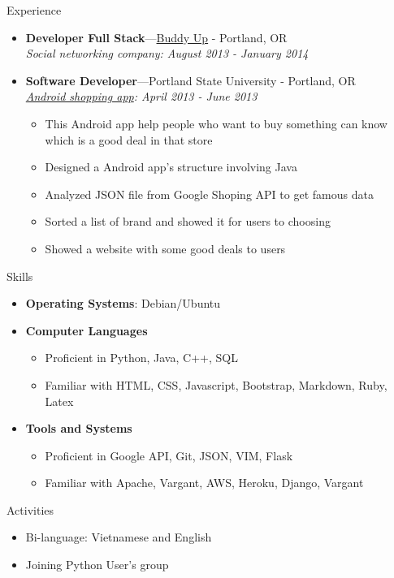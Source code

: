 \documentclass[10pt,oneside]{article}
\newenvironment{ressection}[1]{
    \vspace{4pt}
    {\fontfamily{phv}\selectfont\Large#1}
    \begin{itemize}
    \vspace{3pt}
}{
    \end{itemize}
}
\newcommand{\resitem}[1]{
    \vspace{-4pt}
    \item \begin{flushleft} #1 \end{flushleft}
}
\newcommand{\ressubitem}[1]{
    \vspace{-1pt}
    \item \begin{flushleft} #1 \end{flushleft}
}
\newcommand{\resbigitem}[3]{
    \vspace{-5pt}
    \item
    \textbf{#1}---#2 \\
    \textit{#3}
}
\newenvironment{ressubsec}[3]{
    \resbigitem{#1}{#2}{#3}
    \vspace{-2pt}
    \begin{itemize}
}{
    \end{itemize}
}
\newenvironment{reslist}[1]{
    \resitem{\textbf{#1}}
    \vspace{-5pt}
    \begin{itemize}
}{
    \end{itemize}
}
\begin{document}
\begin{ressection}{Experience}
\begin{ressubsec}{\textbf{Developer Full Stack}}{\href{http://www.buddyup.org/}{Buddy Up} - Portland, OR}{Social networking company: August 2013 - January 2014}
    \end{ressubsec}
    \begin{ressubsec}{\textbf{Software Developer}}{Portland State University - Portland, OR}{\href{https://github.com/vunhatminh241191/BrandTrack}{Android shopping app}: April 2013 - June 2013}
    	\ressubitem{This Android app help people who want to buy something can know which is a good deal in that store}
    	\ressubitem{Designed a Android app's structure involving Java}
    	\ressubitem{Analyzed JSON file from Google Shoping API to get famous data}
    	\ressubitem{Sorted a list of brand and showed it for users to choosing}
    	\ressubitem{Showed a website with some good deals to users}
    \end{ressubsec}
\end{ressection}


\begin{ressection}{Skills}
    \ressubitem{\textbf{Operating Systems}: Debian/Ubuntu}
    \begin{reslist}{Computer Languages}
        \ressubitem{Proficient in Python, Java, C++, SQL}
        \ressubitem{Familiar with HTML, CSS, Javascript, Bootstrap, Markdown, Ruby, Latex}
    \end{reslist}
    \begin{reslist}{Tools and Systems}
        \ressubitem{Proficient in Google API, Git, JSON, VIM, Flask}
        \ressubitem{Familiar with Apache, Vargant, AWS, Heroku, Django, Vargant}
    \end{reslist}
\end{ressection}


\begin{ressection}{Activities}
    \resitem{Bi-language: Vietnamese and English}
    \resitem{Joining Python User's group}
\end{ressection}
\end{document}
